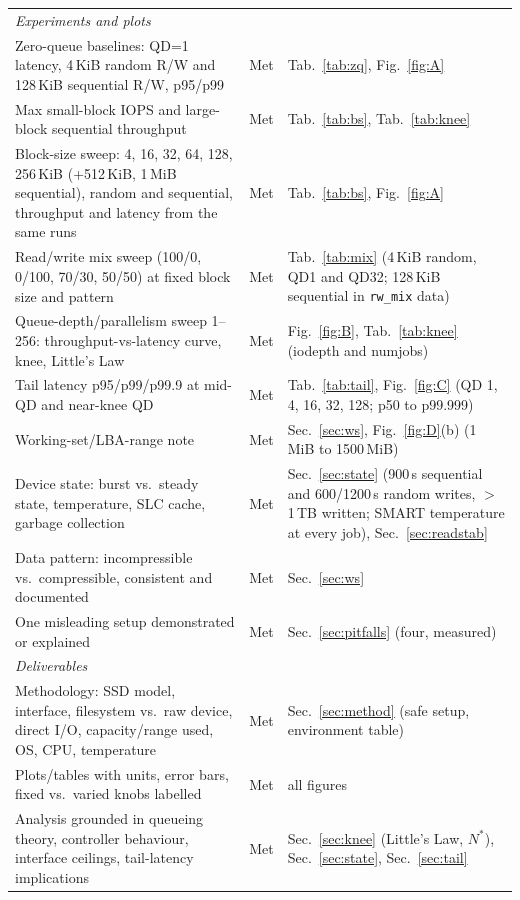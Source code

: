 \documentclass{article}
\begin{document}
\begin{center}
\begin{longtable}{p{6.1cm}p{1.5cm}p{8.0cm}}
\midrule
\multicolumn{3}{l}{\textit{Experiments and plots}} \\
Zero-queue baselines: QD=1 latency, 4\,KiB random R/W and 128\,KiB sequential R/W, p95/p99 & Met & Tab.~\ref{tab:zq}, Fig.~\ref{fig:A} \\
Max small-block IOPS and large-block sequential throughput & Met & Tab.~\ref{tab:bs}, Tab.~\ref{tab:knee} \\
Block-size sweep: 4, 16, 32, 64, 128, 256\,KiB (+512\,KiB, 1\,MiB sequential), random and sequential, throughput and latency from the same runs & Met & Tab.~\ref{tab:bs}, Fig.~\ref{fig:A} \\
Read/write mix sweep (100/0, 0/100, 70/30, 50/50) at fixed block size and pattern & Met & Tab.~\ref{tab:mix} (4\,KiB random, QD1 and QD32; 128\,KiB sequential in \texttt{rw\_mix} data) \\
Queue-depth/parallelism sweep 1--256: throughput-vs-latency curve, knee, Little's Law & Met & Fig.~\ref{fig:B}, Tab.~\ref{tab:knee} (iodepth and numjobs) \\
Tail latency p95/p99/p99.9 at mid-QD and near-knee QD & Met & Tab.~\ref{tab:tail}, Fig.~\ref{fig:C} (QD 1, 4, 16, 32, 128; p50 to p99.999) \\
Working-set/LBA-range note & Met & Sec.~\ref{sec:ws}, Fig.~\ref{fig:D}(b) (1\,MiB to 1500\,MiB) \\
Device state: burst vs.\ steady state, temperature, SLC cache, garbage collection & Met & Sec.~\ref{sec:state} (900\,s sequential and 600/1200\,s random writes, $>$1\,TB written; SMART temperature at every job), Sec.~\ref{sec:readstab} \\
Data pattern: incompressible vs.\ compressible, consistent and documented & Met & Sec.~\ref{sec:ws} \\
One misleading setup demonstrated or explained & Met & Sec.~\ref{sec:pitfalls} (four, measured) \\
\midrule
\multicolumn{3}{l}{\textit{Deliverables}} \\
Methodology: SSD model, interface, filesystem vs.\ raw device, direct I/O, capacity/range used, OS, CPU, temperature & Met & Sec.~\ref{sec:method} (safe setup, environment table) \\
Plots/tables with units, error bars, fixed vs.\ varied knobs labelled & Met & all figures \\
Analysis grounded in queueing theory, controller behaviour, interface ceilings, tail-latency implications & Met & Sec.~\ref{sec:knee} (Little's Law, $N^{*}$), Sec.~\ref{sec:state}, Sec.~\ref{sec:tail} \\
\bottomrule
\end{longtable}
\end{center}
\end{document}
